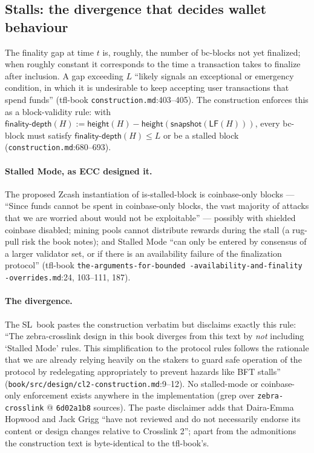 \documentclass[11pt,a4paper]{article}
\theoremstyle{definition}
\begin{document}
\subsection{Stalls: the divergence that decides wallet behaviour}
\label{sec:xl-stalls}

The finality gap at time $t$ is, roughly, the number of bc-blocks not yet
finalized; when roughly constant it corresponds to the time a transaction
takes to finalize after inclusion. A gap exceeding $L$ ``likely signals an
exceptional or emergency condition, in which it is undesirable to keep
accepting user transactions that spend funds'' (tfl-book
\texttt{construction.md}:403--405). The construction enforces this as a
block-validity rule: with $\mathsf{finality\text{-}depth}(H) :=
\mathsf{height}(H) - \mathsf{height}(\mathsf{snapshot}(\mathsf{LF}(H)))$,
every bc-block must satisfy $\mathsf{finality\text{-}depth}(H) \le L$ or
be a stalled block (\texttt{construction.md}:680--693).

\paragraph{Stalled Mode, as ECC designed it.} The proposed Zcash
instantiation of \textsf{is-stalled-block} is coinbase-only blocks ---
``Since funds cannot be spent in coinbase-only blocks, the vast majority
of attacks that we are worried about would not be exploitable'' ---
possibly with shielded coinbase disabled; mining pools cannot distribute
rewards during the stall (a rug-pull risk the book notes); and Stalled
Mode ``can only be entered by consensus of a larger validator set, or if
there is an availability failure of the finalization protocol'' (tfl-book
\texttt{the-arguments\allowbreak-for\allowbreak-bounded\allowbreak
-availability\allowbreak-and\allowbreak-finality\allowbreak
-overrides.md}:24, 103--111, 187).

\paragraph{The divergence.} The SL~book pastes the construction verbatim
but disclaims exactly this rule: ``The zebra-crosslink design in this book
diverges from this text by \emph{not} including `Stalled Mode' rules. This
simplification to the protocol rules follows the rationale that we are
already relying heavily on the stakers to guard safe operation of the
protocol by redelegating appropriately to prevent hazards like BFT
stalls'' (\texttt{book/src/design/cl2-construction.md}:9--12). No
stalled-mode or coinbase-only enforcement exists anywhere in the
implementation (grep over \texttt{zebra-crosslink} @ \texttt{6d02a1b8}
sources). The paste disclaimer adds that Daira-Emma Hopwood and Jack
Grigg ``have not reviewed and do not necessarily endorse its content or
design changes relative to Crosslink 2''; apart from the admonitions the
construction text is byte-identical to the tfl-book's.
\end{document}

